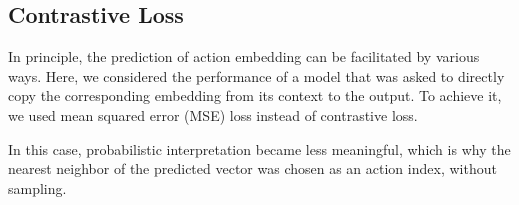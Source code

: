


\subsection{Contrastive Loss}
In principle, the prediction of action embedding can be facilitated by various ways. Here, we considered the performance of a model that was asked to directly copy the corresponding embedding from its context to the output. To achieve it, we used mean squared error (MSE) loss instead of contrastive loss.

In this case, probabilistic interpretation became less meaningful, which is why the nearest neighbor of the predicted vector was chosen as an action index, without sampling.

